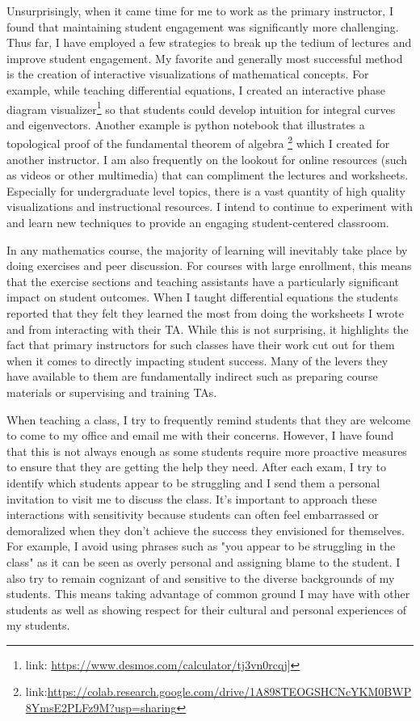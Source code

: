 \documentclass{article}
\begin{document}
Unsurprisingly, when it came time for me to work as the primary instructor, I found that maintaining student engagement was significantly more challenging. Thus far,
I have employed a few strategies to break up the tedium of lectures and improve student engagement. My favorite and generally most successful method is the creation of interactive visualizations of mathematical concepts. For example, while teaching differential equations, I created an interactive phase diagram visualizer\footnote{link: \url{https://www.desmos.com/calculator/tj3vn0rcqj}]} so that students could develop intuition for integral curves and eigenvectors. Another example is python notebook that illustrates a topological proof of the fundamental theorem of algebra \footnote{link:\url{https://colab.research.google.com/drive/1A898TEOGSHCNcYKM0BWP8YmsE2PLFz9M?usp=sharing}} which I created for another instructor. 
I am also frequently on the lookout for online resources (such as videos or other multimedia) that can compliment the lectures and worksheets. Especially for undergraduate level topics, there is a vast quantity of high quality visualizations and instructional resources. I intend to continue to experiment with and learn new techniques to provide an engaging student-centered classroom.

In any mathematics course, the majority of learning will inevitably take place by doing exercises and peer discussion. For courses with large enrollment, this means that the exercise sections and teaching assistants have a particularly significant impact on student outcomes. When I taught differential equations the students reported that they felt they learned the most from doing the worksheets I wrote and from interacting with their TA. While this is not surprising, it highlights the fact that primary instructors for such classes have their work cut out for them when it comes to directly impacting student success. Many of the levers they have available to them are fundamentally indirect such as preparing course materials or supervising and training TAs.

When teaching a class, I try to frequently remind students that they are welcome to come to my office and email me with their concerns.
However, I have found that this is not always enough as some students require more proactive measures to ensure that they are getting the help they need. After each exam, I try to identify which students appear to be struggling and I send them a personal invitation to visit me to discuss the class. It's important to approach these interactions with sensitivity because students can often feel embarrassed or demoralized when they don't achieve the success they envisioned for themselves. For example, I avoid using phrases such as "you appear to be struggling in the class" as it can be seen as overly personal and assigning blame to the student. I also try to remain cognizant of and sensitive to the diverse backgrounds of my students.
This means taking advantage of common ground I may have with other students as well as showing respect for their cultural and personal experiences of my students.
\end{document}
